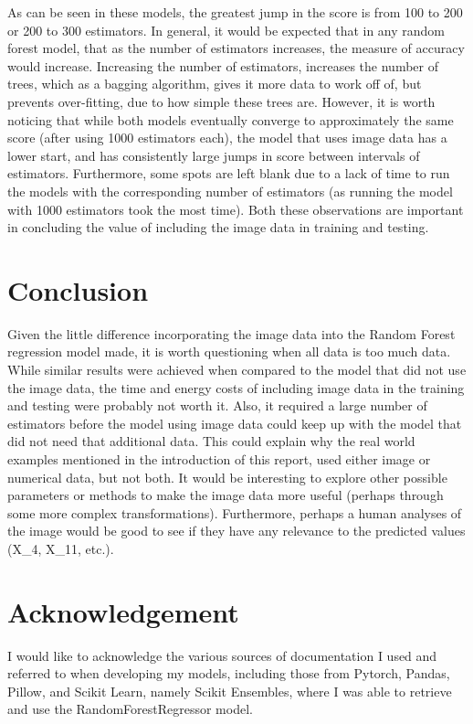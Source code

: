 \documentclass{article}
\begin{document}
As can be seen in these models, the greatest jump in the score is from 100 to 200 or 200 to 300 estimators. In general, it would be expected that in any random forest model, that as the number of estimators increases, the measure of accuracy would increase. Increasing the number of estimators, increases the number of trees, which as a bagging algorithm, gives it more data to work off of, but prevents over-fitting, due to how simple these trees are. However, it is worth noticing that while both models eventually converge to approximately the same score (after using 1000 estimators each), the model that uses image data has a lower start, and has consistently large jumps in score between intervals of estimators. Furthermore, some spots are left blank due to a lack of time to run the models with the corresponding number of estimators (as running the model with 1000 estimators took the most time). Both these observations are important in concluding the value of including the image data in training and testing.



\section{Conclusion}
Given the little difference incorporating the image data into the Random Forest regression model made, it is worth questioning when all data is too much data. While similar results were achieved when compared to the model that did not use the image data, the time and energy costs of including image data in the training and testing were probably not worth it. Also, it required a large number of estimators before the model using image data could keep up with the model that did not need that additional data. This could explain why the real world examples mentioned in the introduction of this report, used either image or numerical data, but not both. It would be interesting to explore other possible parameters or methods to make the image data more useful (perhaps through some more complex transformations). Furthermore, perhaps a human analyses of the image would be good to see if they have any relevance to the predicted values (X\_4, X\_11, etc.).

\newpage

\section*{Acknowledgement}
I would like to acknowledge the various sources of documentation I used and referred to when developing my models, including those from Pytorch, Pandas, Pillow, and Scikit Learn, namely Scikit Ensembles, where I was able to retrieve and use the RandomForestRegressor model.
\nocite{*}
\printbibliography[title=References]
\end{document}
